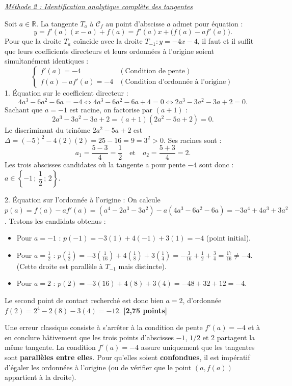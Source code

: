 \documentclass[11pt,a4paper]{article}
\newcommand{\R}{\mathbb{R}}
\begin{document}
\begin{correctionbox}
\medskip
\underline{\textit{Méthode 2 : Identification analytique complète des tangentes}}

Soit $a \in \R$. La tangente $T_a$ à $\mathcal{C}_f$ au point d'abscisse $a$ admet pour équation :
\[
y = f'(a)(x - a) + f(a) = f'(a)x + \bigl(f(a) - a f'(a)\bigr).
\]
Pour que la droite $T_a$ coïncide avec la droite $T_{-1} : y = -4x - 4$, il faut et il suffit que leurs coefficients directeurs et leurs ordonnées à l'origine soient simultanément identiques :
\[
\begin{cases}
f'(a) = -4 & (\text{Condition de pente}) \\
f(a) - a f'(a) = -4 & (\text{Condition d'ordonnée à l'origine})
\end{cases}
\]
1. Équation sur le coefficient directeur :
\[
4a^3 - 6a^2 - 6a = -4 \iff 4a^3 - 6a^2 - 6a + 4 = 0 \iff 2a^3 - 3a^2 - 3a + 2 = 0.
\]
Sachant que $a = -1$ est racine, on factorise par $(a + 1)$ :
\[
2a^3 - 3a^2 - 3a + 2 = (a + 1)(2a^2 - 5a + 2) = 0.
\]
Le discriminant du trinôme $2a^2 - 5a + 2$ est $\Delta = (-5)^2 - 4(2)(2) = 25 - 16 = 9 = 3^2 > 0$.
Ses racines sont :
\[
a_1 = \frac{5 - 3}{4} = \frac{1}{2} \quad \text{et} \quad a_2 = \frac{5 + 3}{4} = 2.
\]
Les trois abscisses candidates où la tangente a pour pente $-4$ sont donc : $a \in \left\{-1\,;\, \dfrac{1}{2}\,;\, 2\right\}$.

2. Équation sur l'ordonnée à l'origine :
On calcule $p(a) = f(a) - a f'(a) = (a^4 - 2a^3 - 3a^2) - a(4a^3 - 6a^2 - 6a) = -3a^4 + 4a^3 + 3a^2$.
Testons les candidats obtenus :
\begin{itemize}[leftmargin=*]
    \item Pour $a = -1$ : $p(-1) = -3(1) + 4(-1) + 3(1) = -4$ (point initial).
    \item Pour $a = \frac{1}{2}$ : $p\left(\frac{1}{2}\right) = -3\left(\frac{1}{16}\right) + 4\left(\frac{1}{8}\right) + 3\left(\frac{1}{4}\right) = -\frac{3}{16} + \frac{1}{2} + \frac{3}{4} = \frac{17}{16} \neq -4$.
    (Cette droite est parallèle à $T_{-1}$ mais distincte).
    \item Pour $a = 2$ : $p(2) = -3(16) + 4(8) + 3(4) = -48 + 32 + 12 = -4$.
\end{itemize}
Le second point de contact recherché est donc bien $a = 2$, d'ordonnée $f(2) = 2^4 - 2(8) - 3(4) = -12$. \hfill \textbf{[2{,}75 points]}
\end{correctionbox}

\begin{alertebox}
Une erreur classique consiste à s'arrêter à la condition de pente $f'(a) = -4$ et à en conclure hâtivement que les trois points d'abscisses $-1$, $1/2$ et $2$ partagent la même tangente.
La condition $f'(a) = -4$ assure uniquement que les tangentes sont \textbf{parallèles entre elles}. Pour qu'elles soient \textbf{confondues}, il est impératif d'égaler les ordonnées à l'origine (ou de vérifier que le point $(a, f(a))$ appartient à la droite).
\end{alertebox}
\end{document}
